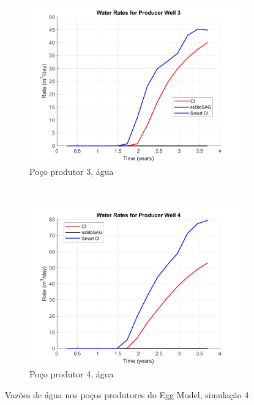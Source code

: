 \begin{figure}[!ht]
	\begin{subfigure}[b]{.45\textwidth}
		\includegraphics[width=\textwidth]{figs/resultadosEgg/imgsim4/EGG_WaterWell3_Zoom}
		\caption{Po\c{c}o produtor 3, \'{a}gua}
		\label{EGG4_WaterWell3}
	\end{subfigure}
	~
	\begin{subfigure}[b]{.45\textwidth}
		\includegraphics[width=\textwidth]{figs/resultadosEgg/imgsim4/EGG_WaterWell4_Zoom}
		\caption{Po\c{c}o produtor 4, \'{a}gua}
		\label{EGG4_WaterWell4}
	\end{subfigure}
	\caption{Vaz\~{o}es de \'{a}gua nos po\c{c}os produtores do Egg Model, simula\c{c}\~{a}o 4}
	\label{EGG4_WaterRates}
\end{figure}

